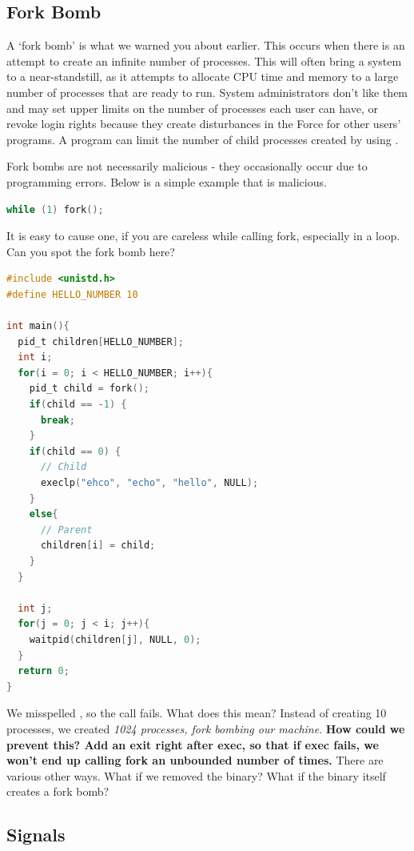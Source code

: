 \subsection{Fork Bomb}

A `fork bomb' is what we warned you about earlier.
This occurs when there is an attempt to create an infinite number of processes.
This will often bring a system to a near-standstill, as it attempts to allocate CPU time and memory to a large number of processes that are ready to run.
System administrators don't like them and may set upper limits on the number of processes each user can have, or revoke login rights because they create disturbances in the Force for other users' programs.
A program can limit the number of child processes created by using .

Fork bombs are not necessarily malicious - they occasionally occur due to programming errors.
Below is a simple example that is malicious.

\begin{lstlisting}[language=C]
while (1) fork();
\end{lstlisting}

It is easy to cause one, if you are careless while calling fork, especially in a loop.
Can you spot the fork bomb here?

\begin{lstlisting}[language=C]
#include <unistd.h>
#define HELLO_NUMBER 10

int main(){
  pid_t children[HELLO_NUMBER];
  int i;
  for(i = 0; i < HELLO_NUMBER; i++){
    pid_t child = fork();
    if(child == -1) {
      break;
    }
    if(child == 0) {
      // Child
      execlp("ehco", "echo", "hello", NULL);
    }
    else{
      // Parent
      children[i] = child;
    }
  }

  int j;
  for(j = 0; j < i; j++){
    waitpid(children[j], NULL, 0);
  }
  return 0;
}
\end{lstlisting}

We misspelled , so the  call fails.
What does this mean? Instead of creating 10 processes, we created \emph{1024 processes, fork bombing our machine}. \textbf{How could we prevent this? Add an exit right after exec, so that if exec fails, we won't end up calling fork an unbounded number of times.}
There are various other ways. What if we removed the  binary? What if the binary itself creates a fork bomb?

\subsection{Signals}

